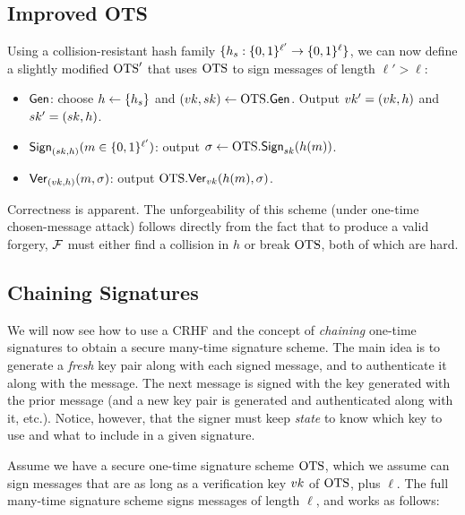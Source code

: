\documentclass[11pt]{article}
\begin{document}
\subsection{Improved OTS}

Using a collision-resistant hash family $\{h_{s} : \{0,1\}^{\ell'} \to
  \{0,1\}^{\ell}\}$, we can now define a slightly modified $\text{OTS}'$ that
uses $\text{OTS}$ to sign messages of length $\ell' > \ell$:

\begin{itemize}
\item $\mathsf{Gen}$: choose $h \gets \{h_s\}$ and $(vk,sk) \gets
  \text{OTS}.\mathsf{Gen}$.  Output $vk' = (vk, h)$ and $sk' = (sk,h)$.
\item $\mathsf{Sign}_{(sk,h)}(m \in \{0,1\}^{\ell'})$: output $\sigma \gets
  \text{OTS}.\mathsf{Sign}_{sk}(h(m))$.
\item $\mathsf{Ver}_{(vk,h)}(m,\sigma)$: output
  $\text{OTS}.\mathsf{Ver}_{vk}(h(m),\sigma)$.
\end{itemize}

Correctness is apparent.  The unforgeability of this scheme (under
one-time chosen-message attack) follows directly from the fact that to
produce a valid forgery, $\mathcal{F}$ must either find a collision in $h$ or
break $\text{OTS}$, both of which are hard.

\subsection{Chaining Signatures}
\label{sec:chaining-signatures}

We will now see how to use a CRHF and the concept of \emph{chaining}
one-time signatures to obtain a secure many-time signature scheme.
The main idea is to generate a \emph{fresh} key pair along with each
signed message, and to authenticate it along with the message.  The
next message is signed with the key generated with the prior message
(and a new key pair is generated and authenticated along with it,
etc.).  Notice, however, that the signer must keep \emph{state} to
know which key to use and what to include in a given signature.

Assume we have a secure one-time signature scheme $\text{OTS}$, which we
assume can sign messages that are as long as a verification key $vk$
of $\text{OTS}$, plus $\ell$.  The full many-time signature scheme signs
messages of length $\ell$, and works as follows:
\end{document}
